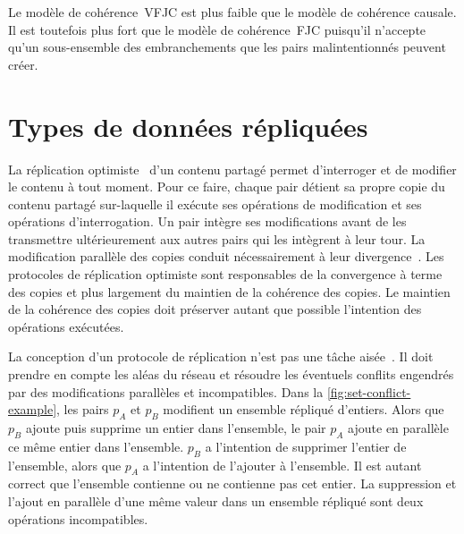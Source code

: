 Le modèle de cohérence~\ac{VFJC} est plus faible que le modèle de cohérence causale.
Il est toutefois plus fort que le modèle de cohérence~\ac{FJC} puisqu'il n'accepte qu'un sous-ensemble des embranchements que les pairs malintentionnés peuvent créer.




\clearpage %
\section{Types de données répliquées}\label{sec:crdt}

La réplication optimiste~\autocite{saito_2005_optimisticreplication} d'un contenu partagé permet d'interroger et de modifier le contenu à tout moment.
Pour ce faire, chaque pair détient sa propre copie du contenu partagé sur-laquelle il exécute ses opérations de modification et ses opérations d'interrogation.
Un pair intègre ses modifications avant de les transmettre ultérieurement aux autres pairs qui les intègrent à leur tour.
La modification parallèle des copies conduit nécessairement à leur divergence~\autocite{dourish_1995_divergence}.
Les protocoles de réplication optimiste sont responsables de la convergence à terme des copies et plus largement du maintien de la cohérence des copies.
Le maintien de la cohérence des copies doit préserver autant que possible l'intention des opérations exécutées.

La conception d'un protocole de réplication n'est pas une tâche aisée~\autocite{oster2005_otisuues}.
Il doit prendre en compte les aléas du réseau \autocite{rotem_falalcies_2006} et résoudre les éventuels conflits engendrés par des modifications parallèles et incompatibles.
Dans la \autoref{fig:set-conflict-example}, les pairs $p_A$ et $p_B$ modifient un ensemble répliqué d'entiers.
Alors que $p_B$ ajoute puis supprime un entier dans l'ensemble, le pair $p_A$ ajoute en parallèle ce même entier dans l'ensemble.
$p_B$ a l'intention de supprimer l'entier de l'ensemble, alors que $p_A$ a l'intention de l'ajouter à l'ensemble.
Il est autant correct que l'ensemble contienne ou ne contienne pas cet entier.
La suppression et l'ajout en parallèle d'une même valeur dans un ensemble répliqué sont deux opérations incompatibles.



